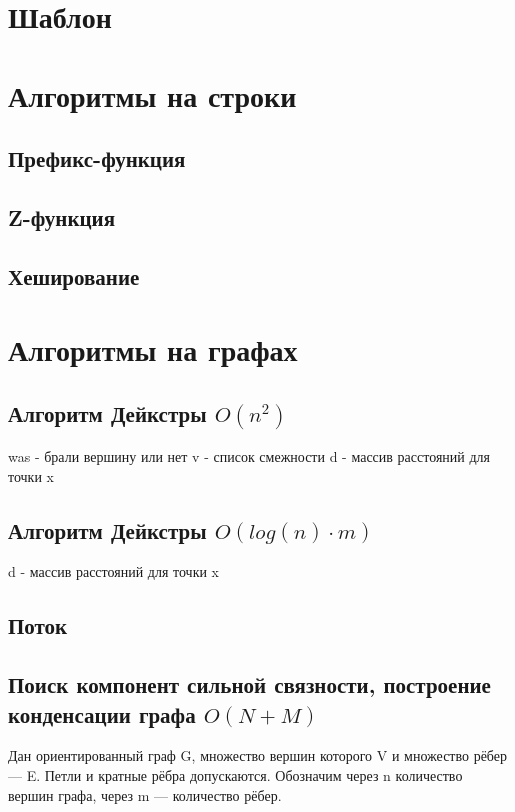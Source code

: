 \documentclass[a4paper]{article}
\begin{document}
	\begin{multicols*}{2}
		\section{Шаблон}
		
		
		\section{Алгоритмы на строки}
		\subsection{Префикс-функция}
		
		\subsection{Z-функция}
		
		\subsection{Хеширование}
		
		
		\section{Алгоритмы на графах}
		\subsection{Алгоритм Дейкстры $O(n^2)$}
		was - брали вершину или нет 
		v - список смежности 
		d - массив расстояний для точки x
		
		\subsection{Алгоритм Дейкстры $O(log(n) \cdot m)$}
		d - массив расстояний для точки x
				
		\subsection{Поток}
		
		\subsection{Поиск компонент сильной связности, построение конденсации графа $O(N+M)$}
		Дан ориентированный граф G, множество вершин которого V и множество рёбер — E. Петли и кратные рёбра допускаются. Обозначим через n количество вершин графа, через m — количество рёбер.
		

\end{multicols*}
\end{document}
